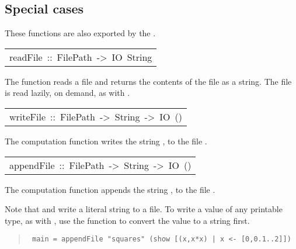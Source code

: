 \subsection{Special cases
}
These functions are also exported by the .
\par

\begin{haddockdesc}
\item[\begin{tabular}{@{}l}
readFile\ ::\ FilePath\ ->\ IO\ String
\end{tabular}]\haddockbegindoc
The  function reads a file and
 returns the contents of the file as a string.
 The file is read lazily, on demand, as with .
\par

\end{haddockdesc}
\begin{haddockdesc}
\item[\begin{tabular}{@{}l}
writeFile\ ::\ FilePath\ ->\ String\ ->\ IO\ ()
\end{tabular}]\haddockbegindoc
The computation   function writes the string ,
 to the file .
\par

\end{haddockdesc}
\begin{haddockdesc}
\item[\begin{tabular}{@{}l}
appendFile\ ::\ FilePath\ ->\ String\ ->\ IO\ ()
\end{tabular}]\haddockbegindoc
The computation   function appends the string ,
 to the file .
\par
Note that  and  write a literal string
 to a file.  To write a value of any printable type, as with ,
 use the  function to convert the value to a string first.
\par
\begin{quote}
{\haddockverb\begin{verbatim}
 main = appendFile "squares" (show [(x,x*x) | x <- [0,0.1..2]])
\end{verbatim}}
\end{quote}

\end{haddockdesc}
